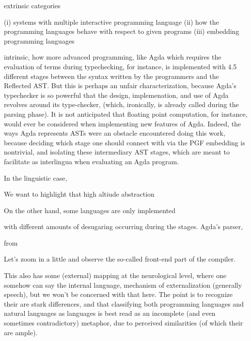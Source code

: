 extrinsic categories

(i) systems with multiple interactive programming language 
(ii) how the programming languages behave with respect to given programs
(iii) embedding programming languages

intrinsic, how more advanced programming, like Agda which requires the
evaluation of terms during typechecking, for instance, is
implemented with 4.5 different stages between the syntax written by the
programmers and the Reflected AST.  But this is perhaps an unfair
characterization, because Agda's typechecker is so powerful that the design,
implemenation, and use of Agda revolves around its type-checker, (which,
ironically, is already called during the parsing phase). It is not
anticipated that floating point computation, for instance, would ever be
considered when implementing new features of Agda. Indeed, the ways Agda
represents ASTs were an obstacle encountered doing this work, because deciding
which stage one should connect with via the PGF embedding is nontrivial, and
isolating these intermediary AST stages, which are meant to facilitate as
interlingua when evaluating an Agda program.

In the linguistic case,

We want to highlight that high
altiude abstraction 


On the other hand, some
languages are only implemented 


with different amounts of
desugaring occurring during the stages. Agda's parser, 



from  


Let's zoom in a little and observe the so-called front-end part of the compiler. 


This also has some (external) mapping at the neurological level, where one
somehow can say the internal language, mechanism of externalization (generally
speech), but we won't be concerned with that here. The point is to recognize
their are stark differences, and that classifying both programming languages and
natural languages as languages is best read as an incomplete (and even sometimes
contradictory) metaphor, due to perceived similarities (of which their are
ample).

